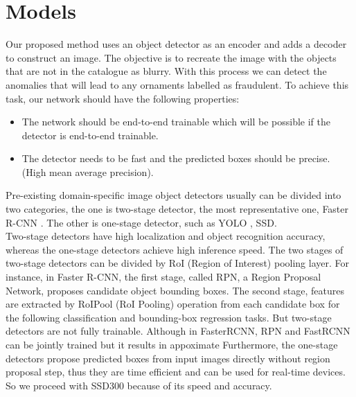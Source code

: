 \documentclass[12pt]{article}
\begin{document}
\section{Models}
Our proposed method uses an object detector as an encoder and adds a decoder to construct an image. The objective is to recreate the image with the objects that are not in the catalogue as blurry. With this process we can detect the anomalies that will lead to any ornaments labelled as fraudulent. To achieve this task, our network should have the following properties:
\begin{itemize}
    \item The network should be end-to-end trainable which will be possible if the detector is end-to-end trainable.
    \item The detector needs to be fast and the predicted boxes should be precise. (High mean average precision).
\end{itemize}
Pre-existing domain-specific image object detectors usually
can be divided into two categories, the one is two-stage
detector, the most representative one, Faster R-CNN \cite{fasterrcnn}.
The other is one-stage detector, such as YOLO \cite{yolov1}, SSD\cite{ssd}.\\
Two-stage detectors have high localization and object
recognition accuracy, whereas the one-stage detectors achieve
high inference speed. The two stages of two-stage detectors
can be divided by RoI (Region of Interest) pooling layer.
For instance, in Faster R-CNN, the first stage, called RPN, a
Region Proposal Network, proposes candidate object bounding
boxes. The second stage, features are extracted by RoIPool
(RoI Pooling) operation from each candidate box for the following classification and bounding-box regression tasks. But two-stage detectors are not fully trainable. Although in FasterRCNN, RPN and FastRCNN can be jointly trained but it results in appoximate Furthermore, the one-stage detectors propose predicted boxes from input images directly without region proposal step, thus they are time efficient and can be used for real-time devices. So we proceed with SSD300 because of its speed and accuracy.\cite{survey}\\
\end{document}
